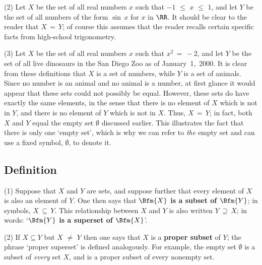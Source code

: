 \V

        (2) Let $X$ be the set of all real numbers $x$ such that $-1\,\,{\leq}\,\,x\,\,{\leq}\,\,1$,
    and let $Y$ be the set of all numbers of the form ${\sin}\,x$ for $x$ in ${\RR}$.
    It should be clear to the reader that $X \,=\, Y$; of course this assumes that the reader recalls certain specific facts from high-school trigonometry.

\V

        (3) Let $X$ be the set of all real numbers $x$ such that $x^{2} \,=\, -2$,
    and let $Y$ be the set of all live dinosaurs in the San Diego Zoo as of January~1,~2000.
    It is clear from these definitions that $X$ is a set of numbers, while $Y$ is a set of animals.
    Since no number is an animal and no animal is a number, at first glance it would appear that these sets could not possibly be equal.
    However, these sets do have exactly the same elements, in the sense that there is no element of $X$ which is not in $Y$,
    and there is no element of $Y$ which is not in $X$.
    Thus, $X \,=\, Y$; in fact, both $X$ and $Y$ equal the empty set ${\emptyset}$ discussed earlier.
    This illustrates the fact that there is only one `empty set', which is why we can refer to {\em the} empty set and can use a fixed symbol, ${\emptyset}$, to denote it.


\VV

            \subsection{\small{\bf Definition}}
            \label{DefA10.095}

\V

\hspace*{\parindent} (1) Suppose that $X$ and $Y$ are sets, and suppose further that every element of $X$ is also an element of $Y$.
    One then says that {\bf $\Bfm{X}$ is a subset of $\Bfm{Y}$}; in symbols, $X \,{\subseteq}\, Y$.
    This relationship between $X$ and $Y$ is also written $Y \,{\supseteq}\, X$; in words: `{\bf $\Bfm{Y}$ is a superset of $\Bfm{X}$}'.

\V

        (2) If $X{\subseteq}Y$ but $X \,\,{\neq}\,\, Y$ then one says that $X$ is a {\bf proper subset} of $Y$;
    the phrase `proper superset' is defined analogously.
    For example, the empty set ${\emptyset}$ is a subset of {\em every} set $X$, and is a proper subset of every nonempty set.

